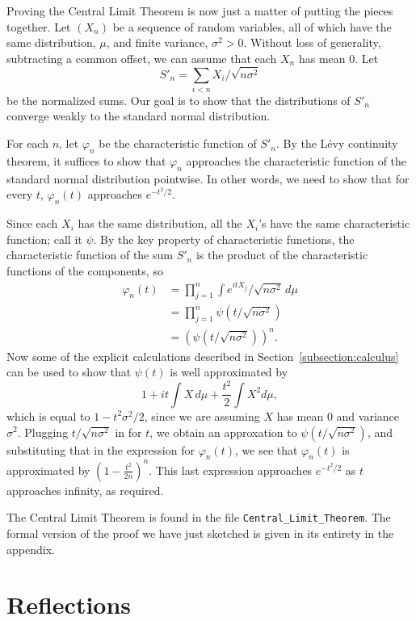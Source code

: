 \documentclass{svjour3}
\newcommand{\ph}{\varphi}
\begin{document}
Proving the Central Limit Theorem is now just a matter of putting the pieces together. Let $(X_n)$ be a sequence of random variables, all of which have the same distribution, $\mu$, and finite variance, $\sigma^2 > 0$. Without loss of generality, subtracting a common offset, we can assume that each $X_n$ has mean $0$. Let
\[
 S'_n = \sum_{i < n} X_i / \sqrt {n \sigma^2}
\]
be the normalized sums. Our goal is to show that the distributions of $S'_n$ converge weakly to the standard normal distribution. 

For each $n$, let $\ph_n$ be the characteristic function of $S'_n$. By the L\'evy continuity theorem, it suffices to show that $\ph_n$ approaches the characteristic function of the standard normal distribution pointwise. In other words, we need to show that for every $t$, $\ph_n(t)$ approaches $e^{-t^2/2}$.

Since each $X_i$ has the same distribution, all the $X_i$'s have the same characteristic function; call it $\psi$. By the key property of characteristic functions, the characteristic function of the sum $S'_n$ is the product of the characteristic functions of the components, so
\begin{align*}
 \ph_n(t) & = \prod_{j = 1}^n \int e^{itX_j} / \sqrt{n \sigma^2} \, d\mu \\
   & = \prod_{j = 1}^n \psi(t / \sqrt{n \sigma^2}) \\
   & = (\psi(t / \sqrt{n \sigma^2}))^n.
\end{align*}
Now some of the explicit calculations described in Section~\ref{subsection:calculus} can be used to show that $\psi(t)$ is well approximated by
\[
1 + it \int X \, d\mu + \frac{t^2}{2} \int X^2 d\mu, 
\]
which is equal to $1 - t^2\sigma^2 / 2$, since we are assuming $X$ has mean $0$ and variance $\sigma^2$. Plugging $t / \sqrt{n \sigma^2}$ in for $t$, we obtain an approxation to $\psi(t / \sqrt{n \sigma^2})$, and substituting that in the expression for $\ph_n(t)$, we see that $\ph_n(t)$ is approximated by $(1 - \frac{t^2}{2n})^n$. This last expression approaches $e^{-t^2/2}$ as $t$ approaches infinity, as required.

The Central Limit Theorem is found in the file \texttt{Central\_Limit\_Theorem}. The formal version of the proof we have just sketched is given in its entirety in the appendix. 

\section{Reflections}
\label{section:reflections}
\end{document}
